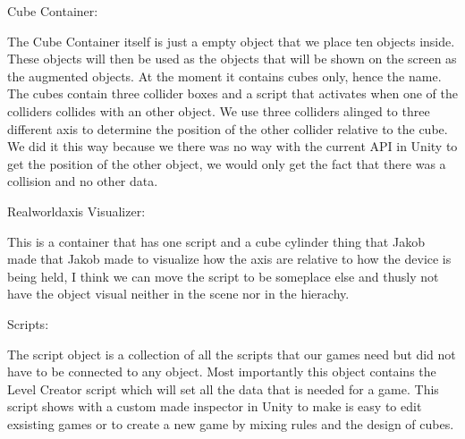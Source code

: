 Cube Container:

The Cube Container itself is just a empty object that we place ten objects inside. These objects will then be used as the objects that will be shown on the screen as the augmented objects. At the moment it contains cubes only, hence the name.
The cubes contain three collider boxes and a script that activates when one of the colliders collides with an other object. We use three colliders alinged to three different axis to determine the position of the other collider relative to the cube. We did it this way because we there was no way with the current API in Unity to get the position of the other object, we would only get the fact that there was a collision and no other data.

Realworldaxis Visualizer:

This is a container that has one script and a cube cylinder thing that Jakob made that Jakob made to visualize how the axis are relative to how the device is being held, I think we can move the script to be someplace else and thusly not have the object visual neither in the scene nor in the hierachy.

Scripts:

The script object is a collection of all the scripts that our games need but did not have to be connected to any object. Most importantly this object contains the Level Creator script which will set all the data that is needed for a game. This script shows with a custom made inspector in Unity to make is easy to edit exsisting games or to create a new game by mixing rules and the design of cubes.


